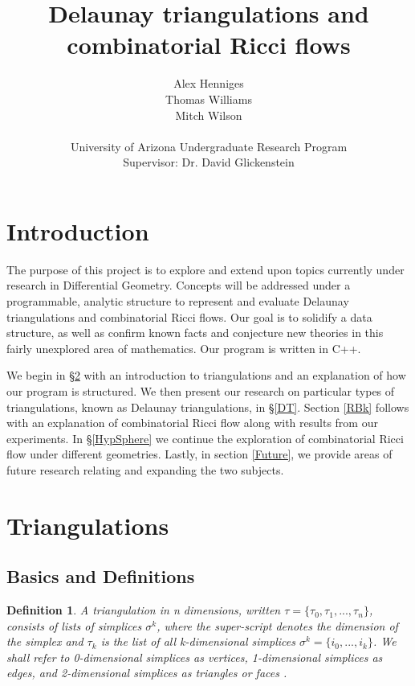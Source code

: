 \documentclass[12pt]{article}
\title{Delaunay triangulations and combinatorial Ricci flows}
\author{Alex Henniges \\ Thomas Williams \\ Mitch Wilson \\ \\ University of Arizona Undergraduate Research Program\\
Supervisor: Dr. David Glickenstein\\
}
\newtheorem{definition}[theorem]{Definition}
\begin{document}
\maketitle
\hangcaption{}
\thispagestyle{empty}
\newpage
\renewcommand\contentsname{Table of Contents}
\tableofcontents

\newpage
\section{Introduction}

The purpose of this project is to explore and extend upon topics currently under research in Differential Geometry. Concepts will be addressed under a programmable, analytic structure to represent and evaluate Delaunay triangulations and combinatorial Ricci flows. Our goal is to solidify a data structure, as well as confirm known facts and conjecture new theories in this fairly unexplored area of mathematics. Our program is written in C++.\newline

We begin in \S\ref{Triangulationschap} with an introduction to triangulations and an explanation of how our program is structured. We then present our research on particular types of triangulations, known as Delaunay triangulations, in \S\ref{DT}. Section \ref{RBk} follows with an explanation of combinatorial Ricci flow along with results from our experiments. In \S\ref{HypSphere} we continue the exploration of combinatorial Ricci flow under different geometries. Lastly, in section \ref{Future}, we provide areas of future research relating and expanding the two subjects.

\section{Triangulations}
\label{Triangulationschap}

\subsection{Basics and Definitions}
\label{BaD}



\begin{definition}
\label{tridef}
A triangulation in \textit{n} dimensions, written $\tau = \{\tau_0, \tau_1, ... , \tau_n\}$, consists of lists of simplices $\sigma^k$, where the super-script denotes the dimension of the simplex and $\tau_k$ is the list of all \textit{k}-dimensional simplices $\sigma^k = \{i_0, ... , i_k\}$. We shall refer to 0-dimensional simplices as vertices, 1-dimensional simplices as edges, and 2-dimensional simplices as triangles or faces \cite{Dave}.
\end{definition}
\end{document}

